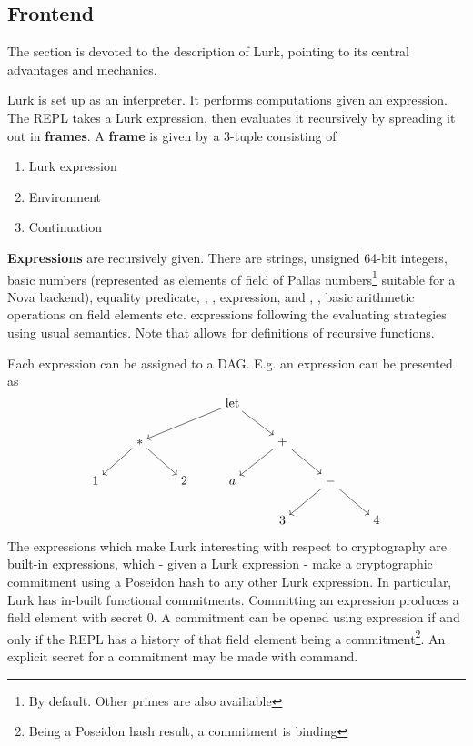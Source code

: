 \documentclass[
    9pt,            %
    techreport,        %
    affiltop,       %
]{art}
\begin{document}
\subsection{Frontend}
The section is devoted to the description of Lurk, pointing to its central advantages and mechanics.

Lurk is set up as an interpreter. It performs computations given an expression. The REPL takes a Lurk expression, then evaluates it recursively by spreading it out in \textbf{frames}. A \textbf{frame} is given by a 3-tuple consisting of 
\begin{enumerate}
    \item Lurk expression
    \item Environment
    \item Continuation
\end{enumerate}

\textbf{Expressions} are recursively given. There are strings, unsigned 64-bit integers, basic numbers (represented as elements of field of Pallas numbers\footnote{By default. Other primes are also availiable} suitable for a Nova backend), equality predicate, , ,  expression, and , , basic arithmetic operations on field elements etc. expressions following the evaluating strategies using usual semantics. Note that  allows for definitions of recursive functions.

Each expression can be assigned to a DAG. E.g. an expression  can be presented as
\[\begin{tikzcd}[cramped]
	&&& {\text{let}} \\
	& {*} &&& {+} \\
	1 && 2 & a && {-} \\
	&&&& 3 && 4
	\arrow[from=1-4, to=2-2]
	\arrow[from=2-2, to=3-1]
	\arrow[from=2-2, to=3-3]
	\arrow[from=1-4, to=2-5]
	\arrow[from=2-5, to=3-4]
	\arrow[from=2-5, to=3-6]
	\arrow[from=3-6, to=4-5]
	\arrow[from=3-6, to=4-7]
\end{tikzcd}\]

The expressions which make Lurk interesting with respect to cryptography are built-in  expressions, which - given a Lurk expression - make a cryptographic commitment using a Poseidon hash to any other Lurk expression. In particular, Lurk has in-built functional commitments. Committing an expression produces a field element with secret 0. A commitment can be opened using expression  if and only if the REPL has a history of that field element being a commitment\footnote{Being a Poseidon hash result, a commitment is binding}. An explicit secret for a commitment may be made with  command. 
\end{document}
